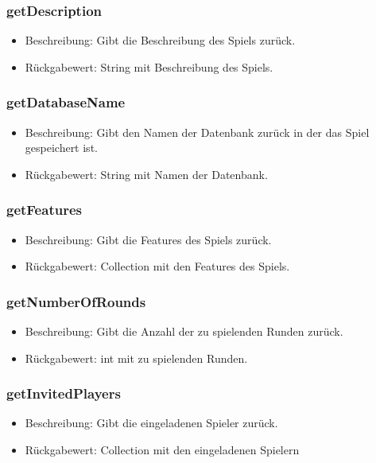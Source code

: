 \documentclass[a4paper]{scrreprt}
\begin{document}
    \subsubsection{getDescription}
    \begin{itemize}
        \item Beschreibung: Gibt die Beschreibung des Spiels zurück.
        \item Rückgabewert: String mit Beschreibung des Spiels.
    \end{itemize}

    \subsubsection{getDatabaseName}
    \begin{itemize}
        \item Beschreibung: Gibt den Namen der Datenbank zurück in der das Spiel gespeichert ist.
        \item Rückgabewert: String mit Namen der Datenbank.
    \end{itemize}

    \subsubsection{getFeatures}
    \begin{itemize}
        \item Beschreibung: Gibt die Features des Spiels zurück.
        \item Rückgabewert: Collection mit den Features des Spiels.
    \end{itemize}

    \subsubsection{getNumberOfRounds}
    \begin{itemize}
        \item Beschreibung: Gibt die Anzahl der zu spielenden Runden zurück.
        \item Rückgabewert: int mit zu spielenden Runden.
    \end{itemize}

    \subsubsection{getInvitedPlayers}
    \begin{itemize}
        \item Beschreibung: Gibt die eingeladenen Spieler zurück.
        \item Rückgabewert: Collection mit den eingeladenen Spielern
    \end{itemize}
\end{document}
